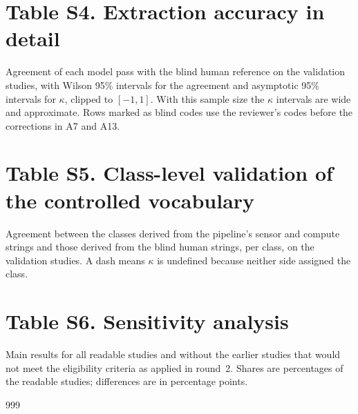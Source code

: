 \documentclass[10pt]{article}
\newlength{\fulllength}\setlength{\fulllength}{\textwidth}
\begin{document}
\section*{Table S4. Extraction accuracy in detail}

Agreement of each model pass with the blind human reference on the
\NcodingStudies{} validation studies, with Wilson 95\% intervals for the
agreement and asymptotic 95\% intervals for $\kappa$, clipped to $[-1,1]$.
With this sample size the $\kappa$ intervals are wide and approximate. Rows
marked as blind codes use the reviewer's codes before the corrections in
A7 and A13.

{\footnotesize
\setlength{\fulllength}{\textwidth}

}

\section*{Table S5. Class-level validation of the controlled vocabulary}

Agreement between the classes derived from the pipeline's sensor and
compute strings and those derived from the blind human strings, per class,
on the \NcodingStudies{} validation studies. A dash means $\kappa$ is
undefined because neither side assigned the class.



\section*{Table S6. Sensitivity analysis}

Main results for all readable studies and without the \NfailsCurrent{}
earlier studies that would not meet the eligibility criteria as applied in
round~2. Shares are percentages of the readable studies; differences are in
percentage points.

{\small

}

\renewcommand{\refname}{References for Table S2}
\begin{thebibliography}{999}

\end{thebibliography}
\end{document}
